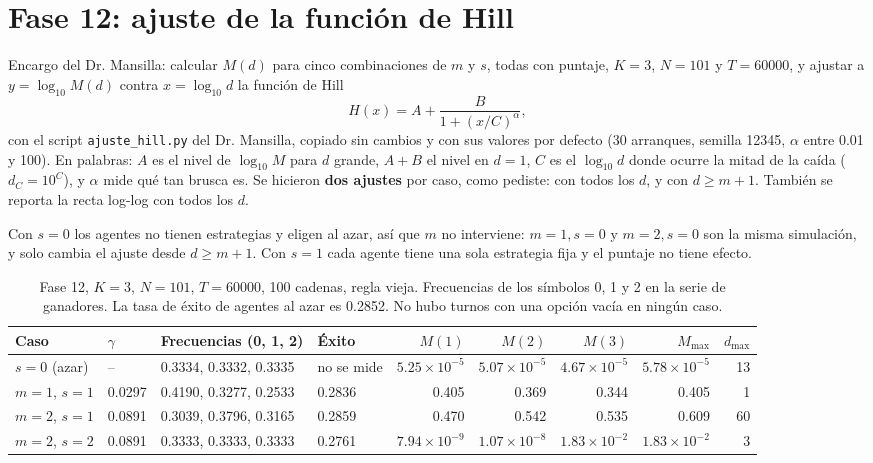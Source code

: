 \documentclass[11pt,letterpaper]{article}
\begin{document}
\section{Fase 12: ajuste de la función de Hill}
Encargo del Dr. Mansilla: calcular $M(d)$ para cinco combinaciones de $m$ y $s$, todas con puntaje, $K=3$, $N=101$ y $T=60000$, y ajustar a $y=\log_{10}M(d)$ contra $x=\log_{10}d$ la función de Hill
\begin{equation*}
H(x)=A+\frac{B}{1+(x/C)^{\alpha}},
\end{equation*}
con el script \texttt{ajuste\_hill.py} del Dr. Mansilla, copiado sin cambios y con sus valores por defecto (30 arranques, semilla 12345, $\alpha$ entre 0.01 y 100). En palabras: $A$ es el nivel de $\log_{10}M$ para $d$ grande, $A+B$ el nivel en $d=1$, $C$ es el $\log_{10}d$ donde ocurre la mitad de la caída ($d_C=10^C$), y $\alpha$ mide qué tan brusca es. Se hicieron \textbf{dos ajustes} por caso, como pediste: con todos los $d$, y con $d\ge m+1$. También se reporta la recta log-log con todos los $d$.

Con $s=0$ los agentes no tienen estrategias y eligen al azar, así que $m$ no interviene: $m=1,s=0$ y $m=2,s=0$ son la misma simulación, y solo cambia el ajuste desde $d\ge m+1$. Con $s=1$ cada agente tiene una sola estrategia fija y el puntaje no tiene efecto.

\begin{table}[H]
\centering
\footnotesize
\setlength{\tabcolsep}{3.5pt}
\caption{Fase 12, $K=3$, $N=101$, $T=60000$, 100 cadenas, regla vieja. Frecuencias de los símbolos 0, 1 y 2 en la serie de ganadores. La tasa de éxito de agentes al azar es 0.2852. No hubo turnos con una opción vacía en ningún caso.}\label{tab:f12casos}
\begin{adjustbox}{max width=\textwidth}
\begin{tabular}{llllrrrrr}
\toprule
Caso & $\gamma$ & Frecuencias (0, 1, 2) & Éxito & $M(1)$ & $M(2)$ & $M(3)$ & $M_{\max}$ & $d_{\max}$ \\
\midrule
$s=0$ (azar) & -- & 0.3334, 0.3332, 0.3335 & no se mide & $5.25\times10^{-5}$ & $5.07\times10^{-5}$ & $4.67\times10^{-5}$ & $5.78\times10^{-5}$ & 13 \\
$m=1$, $s=1$ & 0.0297 & 0.4190, 0.3277, 0.2533 & 0.2836 & 0.405 & 0.369 & 0.344 & 0.405 & 1 \\
$m=2$, $s=1$ & 0.0891 & 0.3039, 0.3796, 0.3165 & 0.2859 & 0.470 & 0.542 & 0.535 & 0.609 & 60 \\
$m=2$, $s=2$ & 0.0891 & 0.3333, 0.3333, 0.3333 & 0.2761 & $7.94\times10^{-9}$ & $1.07\times10^{-8}$ & $1.83\times10^{-2}$ & $1.83\times10^{-2}$ & 3 \\
\bottomrule
\end{tabular}
\end{adjustbox}
\end{table}
\end{document}
